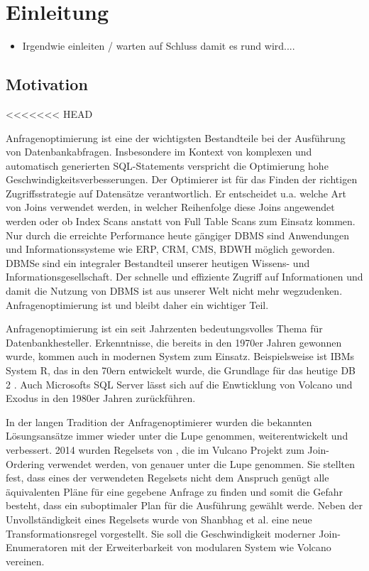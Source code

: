 \chapter{Einleitung}

\begin{itemize}
\item Irgendwie einleiten / warten auf Schluss damit es rund wird....
\end{itemize}



\section{Motivation}
<<<<<<< HEAD


Anfragenoptimierung ist eine der wichtigsten Bestandteile bei der Ausführung von Datenbankabfragen. Insbesondere im Kontext von komplexen und automatisch generierten SQL-Statements verspricht die Optimierung hohe Geschwindigkeitsverbesserungen. Der Optimierer ist für das Finden der richtigen Zugriffsstrategie auf Datensätze verantwortlich. Er entscheidet u.a. welche Art von Joins verwendet werden, in welcher Reihenfolge diese Joins angewendet werden oder ob Index Scans anstatt von Full Table Scans zum Einsatz kommen. Nur durch die erreichte Performance heute gängiger \ac{DBMS} sind Anwendungen und Informationssysteme wie \ac{ERP}, \ac{CRM}, \ac{CMS}, \ac{BDWH} möglich geworden. \ac{DBMS}e sind ein integraler Bestandteil unserer heutigen Wissens- und Informationsgesellschaft. Der schnelle und effiziente Zugriff auf Informationen und damit die Nutzung von \ac{DBMS} ist aus unserer Welt nicht mehr wegzudenken. Anfragenoptimierung ist und bleibt daher ein wichtiger Teil.

Anfragenoptimierung ist ein seit Jahrzenten bedeutungsvolles Thema für Datenbankhesteller. Erkenntnisse, die bereits in den 1970er Jahren gewonnen wurde, kommen auch in modernen System zum Einsatz. Beispielsweise ist IBMs System R, das in den 70ern entwickelt wurde, die Grundlage für das heutige DB 2  \cite{wade2012ibm}. Auch Microsofts SQL Server lässt sich auf die Enwticklung von Volcano und Exodus in den 1980er Jahren zurückführen.

In der langen Tradition der Anfragenoptimierer wurden die bekannten Lösungsansätze immer wieder unter die Lupe genommen, weiterentwickelt und verbessert. 2014 wurden Regelsets von \cite{pellenkoft1997complexity}, die im Vulcano Projekt zum Join-Ordering verwendet werden, von \cite{shanbhag2014optimizing} genauer unter die Lupe genommen. 
Sie stellten fest, dass eines der verwendeten Regelsets nicht dem Anspruch genügt alle äquivalenten Pläne für eine gegebene Anfrage zu finden und somit die Gefahr besteht, dass ein suboptimaler Plan für die Ausführung gewählt werde. Neben der Unvollständigkeit eines Regelsets wurde von Shanbhag et al. eine neue Transformationsregel vorgestellt. Sie soll die Geschwindigkeit moderner Join-Enumeratoren mit der Erweiterbarkeit von modularen System wie Volcano vereinen.

